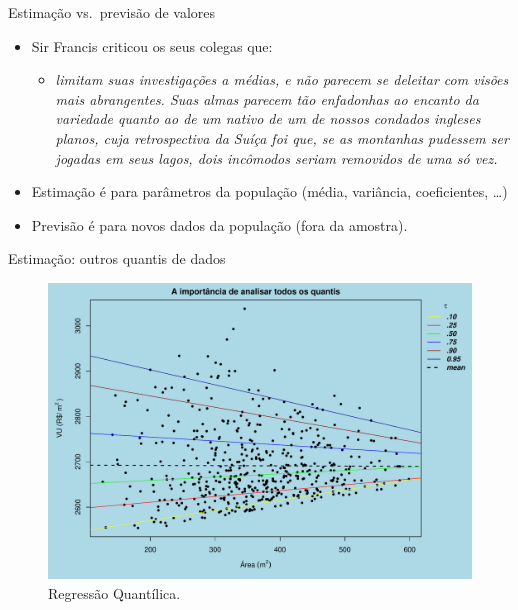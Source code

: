 \documentclass[9pt,ignorenonframetext,aspectratio=169]{beamer}
\providecommand{\tightlist}{%
  \setlength{\itemsep}{0pt}\setlength{\parskip}{0pt}}
\begin{document}
\begin{frame}{Estimação vs.~previsão de valores}
\protect\hypertarget{estimauxe7uxe3o-vs.-previsuxe3o-de-valores}{}

\begin{itemize}[<+->]
\tightlist
\item
  Sir Francis \textcite[p.~62]{galton}
  \autocite[\emph{apud}][p.~350]{koenker2000} criticou os seus colegas
  que:

  \begin{itemize}[<+->]
  \tightlist
  \item
    \emph{limitam suas investigações a médias, e não parecem se deleitar com
    visões mais abrangentes. Suas almas parecem tão enfadonhas ao encanto da
    variedade quanto ao de um nativo de um de nossos condados ingleses planos, cuja
    retrospectiva da Suíça foi que, se as montanhas pudessem ser jogadas em seus
    lagos, dois incômodos seriam removidos de uma só vez.}
  \end{itemize}
\item
  Estimação é para parâmetros da população (média, variância,
  coeficientes, \ldots)
\item
  Previsão é para novos dados da população (fora da amostra).
\end{itemize}

\end{frame}

\begin{frame}{Estimação: outros quantis de dados}
\protect\hypertarget{estimauxe7uxe3o-outros-quantis-de-dados}{}

\begin{figure}

{\centering \includegraphics[width=0.5\linewidth]{index_files/figure-beamer/qr-1} 

}

\caption{Regressão Quantílica.}\label{fig:qr}
\end{figure}

\end{frame}
\end{document}
